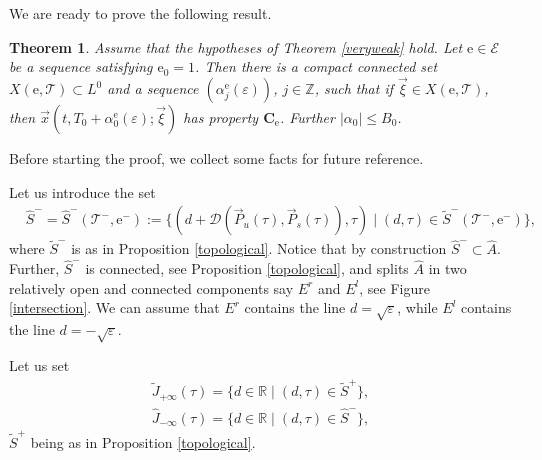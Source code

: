 \documentclass[10pt]{article}
\numberwithin{equation}{section}
\def\al{\alpha}
\def\ep{\varepsilon}
\def\Z{{\mathbb Z}}
\def\R{{\mathbb R}}
\def\ee{{\mathrm e}}
\def\EE{{\mathcal E}}
\def\TT{{\mathcal T}}
\def\DDD{\mathscr{D}}
\def\P{\vec{P}}
\def\xxi{\vec{\xi}}
\def\x{\vec{x}}
\newcommand\bs[1]{{\boldsymbol{#1}}}
\newtheorem{theorem}{Theorem}[section]
\theoremstyle{definition}
\theoremstyle{remark}
\begin{document}
We are ready to prove the following result.
\begin{theorem}\label{theoremkey}
  Assume that  the hypotheses of Theorem  \ref{veryweak} hold. Let $\ee \in \EE$ be a sequence satisfying
   $\ee_0=1$. Then there is a compact  connected  set $X(\ee, \TT)\subset L^0$ and a sequence $(\al_j^{\ee}(\ep))$, $j \in
   \Z$,
   such that if $\xxi \in X(\ee, \TT)$,
   then $\x(t,T_0+\al_0^\ee(\ep); \xxi)$ has property  $\bs{C_{\ee}}$.  Further $|\alpha_0| \le B_0$.
\end{theorem}

 Before starting the proof, we collect some facts for future reference.

Let us introduce the set
\begin{equation}\label{defhatS}
\begin{split}
     & \hat{S}^- = \hat{S}^-(\TT^-, \ee^-):= \{ (d+\DDD(\P_u(\tau), \P_s(\tau)), \tau) \mid   (d,\tau) \in \tilde{S}^-(\TT^-, \ee^-)
     \},
\end{split}
\end{equation}
 where $\tilde{S}^-$ is as in Proposition \ref{topological}.
Notice that by construction $\hat{S}^- \subset \hat{A}$.
Further, $\hat{S}^-$ is connected, see Proposition \ref{topological}, and splits $\hat{A}$ in two relatively open and connected
components say $E^r$ and $E^l$, see Figure \ref{intersection}.  We can assume that
$E^r$ contains the line $d= \sqrt{\ep}$, while
$E^l$ contains the line $d= -\sqrt{\ep}$.




  Let us set
  \begin{gather*}
  	\tilde{J}_{+\infty}(\tau)= \{ d\in\R\mid (d,\tau) \in \tilde{S}^+ \},\\
  	\hat{J}_{-\infty}(\tau)= \{ d\in\R\mid (d,\tau) \in \hat{S}^- \},
  \end{gather*}
 $\tilde{S}^+$ being as in Proposition \ref{topological}.
\end{document}
